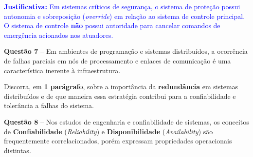 \documentclass[12pt,a4paper]{article}
\begin{document}
\vspace{0.2cm}
\noindent\textcolor{blue}{\small\textbf{Justificativa:} Em sistemas críticos de segurança, o sistema de proteção possui autonomia e sobreposição (\textit{override}) em relação ao sistema de controle principal. O sistema de controle \textbf{não} possui autoridade para cancelar comandos de emergência acionados nos atuadores.}

\vspace{0.5cm}

\textbf{Questão 7} -- Em ambientes de programação e sistemas distribuídos, a ocorrência de falhas parciais em nós de processamento e enlaces de comunicação é uma característica inerente à infraestrutura.

\vspace{0.2cm}

Discorra, em \textbf{1 parágrafo}, sobre a importância da \textbf{redundância} em sistemas distribuídos e de que maneira essa estratégia contribui para a confiabilidade e tolerância a falhas do sistema.

\vspace{0.2cm}

\noindent
{}

\vspace{0.5cm}

\textbf{Questão 8} -- Nos estudos de engenharia e confiabilidade de sistemas, os conceitos de \textbf{Confiabilidade} (\textit{Reliability}) e \textbf{Disponibilidade} (\textit{Availability}) são frequentemente correlacionados, porém expressam propriedades operacionais distintas.
\end{document}
